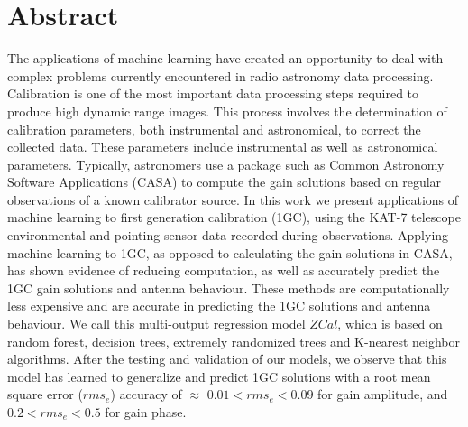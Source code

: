 \chapter*{Abstract} 


The applications of machine learning have created an opportunity to deal with complex problems currently encountered in radio astronomy data processing. Calibration is one of the most important data processing steps required to produce high dynamic range images. This process involves the determination of calibration parameters, both instrumental and astronomical, to correct the
collected data. These parameters include instrumental as well as astronomical parameters. Typically, astronomers use a package such as Common Astronomy Software Applications (CASA) to compute the gain solutions based on regular observations of a known calibrator source. In this work we present applications of machine learning to first generation calibration (1GC), using the KAT-7 telescope environmental and pointing sensor data recorded during observations. Applying machine learning to 1GC, as opposed to calculating the gain solutions in CASA, has shown evidence of reducing computation, as well as accurately predict the 1GC gain solutions and antenna behaviour. These methods are computationally less expensive and are accurate in predicting the 1GC solutions and antenna behaviour. We call this multi-output regression model $\textit{ZCal}$, which is based on random forest, decision trees, extremely randomized trees and K-nearest neighbor algorithms. After the testing and validation of our models, we observe that this model has learned to generalize and predict 1GC solutions with a root mean square error ($rms_{e}$) accuracy of $\approx$ $0.01< rms_{e} <0.09$ for gain amplitude, and $0.2< rms_{e}<0.5$ for gain phase.  


\vfill
\newpage
